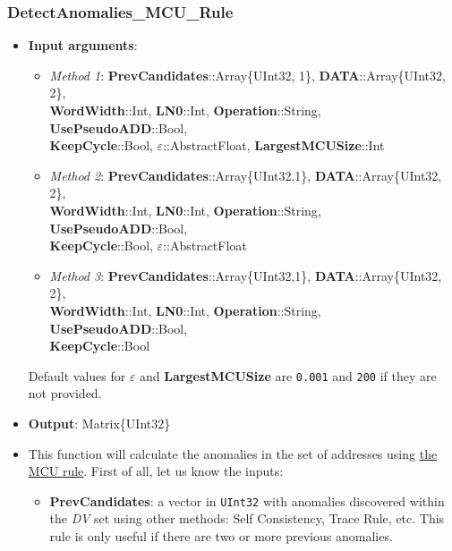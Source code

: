  \subsubsection*{DetectAnomalies\_MCU\_Rule}\label{Fun:DetectAnomaliesMCURule}
 \begin{itemize}
 	\item \textbf{Input arguments}: 
 	\begin{itemize}

 		\item \textit{Method 1}: \textbf{PrevCandidates}::Array\{UInt32, 1\}, \textbf{DATA}::Array\{UInt32, 2\}, \\ \textbf{WordWidth}::Int, \textbf{LN0}::Int,  \textbf{Operation}::String, \textbf{UsePseudoADD}::Bool, \\ \textbf{KeepCycle}::Bool, \textbf{\(\varepsilon\)}::AbstractFloat, \textbf{LargestMCUSize}::Int
 		\item \textit{Method 2}:
 		\textbf{PrevCandidates}::Array\{UInt32,1\}, \textbf{DATA}::Array\{UInt32, 2\}, \\ \textbf{WordWidth}::Int, \textbf{LN0}::Int,  \textbf{Operation}::String, \textbf{UsePseudoADD}::Bool, \\ \textbf{KeepCycle}::Bool,  \textbf{\(\varepsilon\)}::AbstractFloat
 		\item \textit{Method 3}: 			%
 		\textbf{PrevCandidates}::Array\{UInt32,1\}, \textbf{DATA}::Array\{UInt32, 2\}, \\ \textbf{WordWidth}::Int, \textbf{LN0}::Int,  \textbf{Operation}::String, \textbf{UsePseudoADD}::Bool,\\ \textbf{KeepCycle}::Bool
 	\end{itemize}
 	Default values for \textbf{\(\varepsilon\)} and \textbf{LargestMCUSize} are \texttt{0.001} and \texttt{200} if they are not provided.
 	\item \textbf{Output}: Matrix\{UInt32\}
 	\item This function will calculate the anomalies in the set of addresses using \hyperref[Subsec:MCURule]{the MCU rule}. 
 	First of all, let us know the inputs:
 	\begin{itemize}
 		
 		\item \textbf{PrevCandidates}: a vector in \texttt{UInt32} with anomalies discovered within the \textit{DV} set using other methods: Self Consistency, Trace Rule, etc. This rule is only useful if there are two or more previous anomalies. 
 		

\end{itemize}
\end{itemize}
